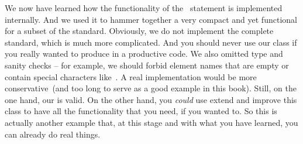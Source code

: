 We now have learned how the functionality of the ~statement is implemented internally.
And we used it to hammer together a very compact and yet functional  for a subset of the  standard.
Obviously, we do not implement the complete standard, which is much more complicated.
And you should never use our class if you really wanted to produce  in a productive code.
We also omitted type and sanity checks -- for example, we should forbid element names that are empty or contain special characters like~\textil{<}.
A real implementation would be more conservative~(and too long to serve as a good example in this book).
Still, on the one hand, our  is valid.
On the other hand, you \emph{could} use extend and improve this class to have all the functionality that you need, if you wanted to.
So this is actually another example that, at this stage and with what you have learned, you can already do real things.%
%
\FloatBarrier%
\endhsection%
%
%
\label{sec:dunderMethodsOverview}%
%
